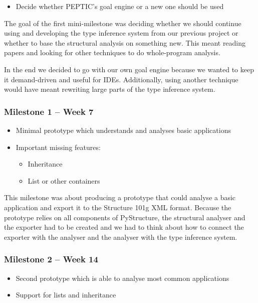 \documentclass[12pt,halfparskip,DIV11,BCOR10mm]{scrreprt}
\begin{document}
\begin{itemize}
    \item Decide whether PEPTIC's goal engine or a new one should be used
\end{itemize}

The goal of the first mini-milestone was deciding whether we should continue using and developing the type inference system from our previous project or whether to base the structural analysis on something new. This meant reading papers and looking for other techniques to do whole-program analysis.

In the end we decided to go with our own goal engine because we wanted to keep it demand-driven and useful for IDEs. Additionally, using another technique would have meant rewriting large parts of the type inference system.

\subsubsection{Milestone 1 – Week 7}

\begin{itemize}
    \item Minimal prototype which understands and analyses basic applications
    \item Important missing features:
    \begin{itemize}
        \item Inheritance
        \item List or other containers
    \end{itemize}
\end{itemize}

This milestone was about producing a prototype that could analyse a basic application and export it to the Structure 101g XML format. Because the prototype relies on all components of PyStructure, the structural analyser and the exporter had to be created and we had to think about how to connect the exporter with the analyser and the analyser with the type inference system.

\subsubsection{Milestone 2 – Week 14}

\begin{itemize}
    \item Second prototype which is able to analyse most common applications
    \item Support for lists and inheritance
\end{itemize}
\end{document}
